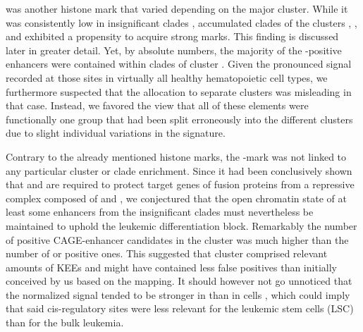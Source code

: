 \hisfourthree was another histone mark that varied depending on the major cluster. While it was consistently low in insignificant clades , accumulated clades of the clusters \amitthree, \amitfive, \amiteight and \amitnine exhibited a propensity to acquire strong \hisfourthree marks. This finding is discussed later in greater detail. Yet, by absolute numbers, the majority of the \hisfourthree-positive enhancers were contained within clades of cluster  . Given the pronounced \hisfourthree signal recorded at those sites in virtually all healthy hematopoietic cell types, we furthermore suspected that the allocation to separate clusters was misleading in that case. Instead, we favored the view that all of these elements were functionally one group that had been split erroneously into the different clusters due to slight individual variations in the \hisfourone signature. 

Contrary to the already mentioned histone marks, the -mark \hisseventyninetwo\cite{Bernt2011} was not linked to any particular cluster or clade enrichment. Since it had been conclusively shown that  and \hisseventyninetwo are required to protect target genes of  fusion proteins from a repressive complex composed of  and \cite{Chen2015}, we conjectured that the open chromatin state of at least some enhancers from the insignificant clades must nevertheless be maintained to uphold the leukemic differentiation block\cite{Cusan2018}. Remarkably the number of \hisseventyninetwo positive CAGE-enhancer candidates in the \amitten cluster was much higher than the number of \histwentysevenac or \hiseighteenac positive ones. This suggested that cluster  comprised relevant amounts of KEEs\cite{Godfrey2019} and might have contained less false positives than initially conceived by us based on the \histwentysevenac mapping. It should however not go unnoticed that the normalized signal tended to be stronger in \kitlow than in \kithi cells , which could imply that said cis-regulatory sites were less relevant for the leukemic stem cells (LSC) than for the bulk leukemia. 

